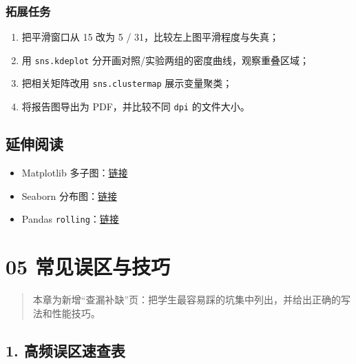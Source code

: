 \subsubsection{拓展任务}\label{ux62d3ux5c55ux4efbux52a1-5}

\begin{enumerate}
\def\labelenumi{\arabic{enumi}.}
\tightlist
\item
  把平滑窗口从 15 改为 5 / 31，比较左上图平滑程度与失真；
\item
  用 \texttt{sns.kdeplot} 分开画对照/实验两组的密度曲线，观察重叠区域；
\item
  把相关矩阵改用 \texttt{sns.clustermap} 展示变量聚类；
\item
  将报告图导出为 PDF，并比较不同 \texttt{dpi} 的文件大小。
\end{enumerate}

\subsection{延伸阅读}\label{ux5ef6ux4f38ux9605ux8bfb-24}

\begin{itemize}
\tightlist
\item
  Matplotlib
  多子图：\href{https://matplotlib.org/stable/tutorials/intermediate/subplots.html}{链接}
\item
  Seaborn
  分布图：\href{https://seaborn.pydata.org/generated/seaborn.histplot.html}{链接}
\item
  Pandas
  \texttt{rolling}：\href{https://pandas.pydata.org/docs/reference/api/pandas.DataFrame.rolling.html}{链接}
\end{itemize}

\section{05
常见误区与技巧}\label{ux5e38ux89c1ux8befux533aux4e0eux6280ux5de7-4}

\begin{quote}
本章为新增``查漏补缺''页：把学生最容易踩的坑集中列出，并给出正确的写法和性能技巧。
\end{quote}

\subsection{1.
高频误区速查表}\label{ux9ad8ux9891ux8befux533aux901fux67e5ux8868-4}

